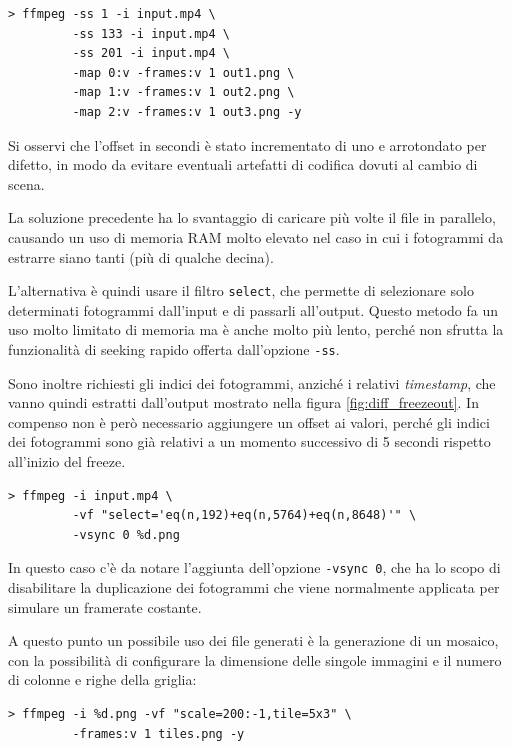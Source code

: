 \begin{verbatim}
> ffmpeg -ss 1 -i input.mp4 \
         -ss 133 -i input.mp4 \
         -ss 201 -i input.mp4 \
         -map 0:v -frames:v 1 out1.png \
         -map 1:v -frames:v 1 out2.png \
         -map 2:v -frames:v 1 out3.png -y
\end{verbatim}

Si osservi che l'offset in secondi è stato incrementato di uno e arrotondato per difetto, in modo da evitare eventuali artefatti di codifica dovuti al cambio di scena.

La soluzione precedente ha lo svantaggio di caricare più volte il file in parallelo, causando un uso di memoria RAM molto elevato nel caso in cui i fotogrammi da estrarre siano tanti (più di qualche decina).

L'alternativa è quindi usare il filtro \texttt{select}, che permette di selezionare solo determinati fotogrammi dall'input e di passarli all'output. Questo metodo fa un uso molto limitato di memoria ma è anche molto più lento, perché non sfrutta la funzionalità di seeking rapido offerta dall'opzione \texttt{-ss}.

Sono inoltre richiesti gli indici dei fotogrammi, anziché i relativi \emph{timestamp}, che vanno quindi estratti dall'output mostrato nella figura \ref{fig:diff_freezeout}. In compenso non è però necessario aggiungere un offset ai valori, perché gli indici dei fotogrammi sono già relativi a un momento successivo di 5 secondi rispetto all'inizio del freeze.

\begin{verbatim}
> ffmpeg -i input.mp4 \
         -vf "select='eq(n,192)+eq(n,5764)+eq(n,8648)'" \
         -vsync 0 %d.png
\end{verbatim}

In questo caso c'è da notare l'aggiunta dell'opzione \texttt{-vsync 0}, che ha lo scopo di disabilitare la duplicazione dei fotogrammi che viene normalmente applicata per simulare un framerate costante.

A questo punto un possibile uso dei file generati è la generazione di un mosaico, con la possibilità di configurare la dimensione delle singole immagini e il numero di colonne e righe della griglia:

\begin{verbatim}
> ffmpeg -i %d.png -vf "scale=200:-1,tile=5x3" \
         -frames:v 1 tiles.png -y
\end{verbatim}

